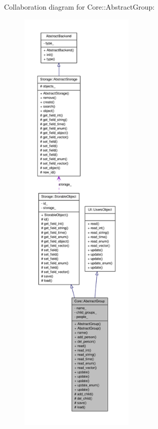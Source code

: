 Collaboration diagram for Core::AbstractGroup:
\nopagebreak
\begin{figure}[H]
\begin{center}
\leavevmode
\includegraphics[height=600pt]{dd/dad/classCore_1_1AbstractGroup__coll__graph}
\end{center}
\end{figure}
